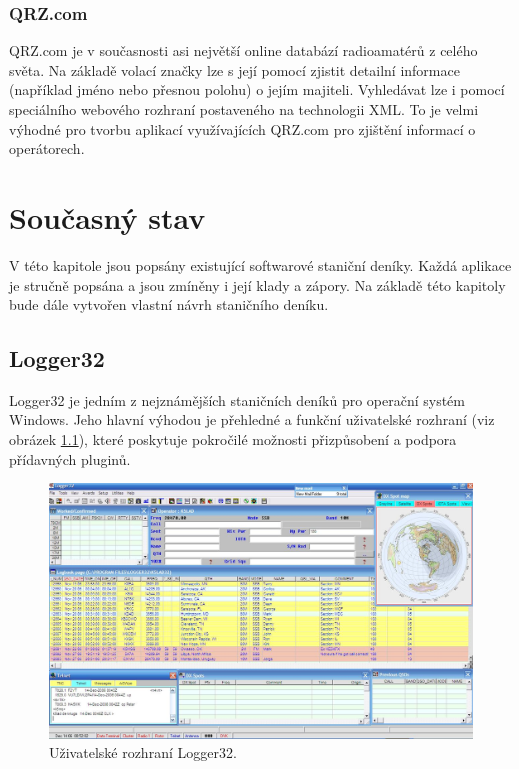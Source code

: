 \subsection{QRZ.com}

QRZ.com je v současnosti asi největší online databází radioamatérů z celého světa. Na základě volací značky lze s její pomocí zjistit detailní
informace (například jméno nebo přesnou polohu) o jejím majiteli. Vyhledávat lze i pomocí speciálního webového rozhraní
postaveného na technologii XML. To je velmi výhodné pro tvorbu aplikací využívajících QRZ.com pro zjištění informací o
operátorech.

\chapter{Současný stav}
\label{soucasnost}

V této kapitole jsou popsány existující softwarové staniční deníky. Každá aplikace je stručně
popsána a jsou zmíněny i její klady a zápory. Na základě této kapitoly bude dále
vytvořen vlastní návrh staničního deníku.

\section{Logger32}%

Logger32 je jedním z nejznámějších staničních deníků pro operační systém Windows. Jeho hlavní výhodou je přehledné a funkční
uživatelské rozhraní (viz obrázek \ref{fig:logger32}), které poskytuje pokročilé možnosti přizpůsobení a podpora přídavných pluginů.

\begin{figure}[h]
\centering
\includegraphics[trim=0cm 0cm 0cm 0cm, scale=0.33]{fig/logger32}
\caption{Uživatelské rozhraní Logger32.}
\label{fig:logger32}
\end{figure}

